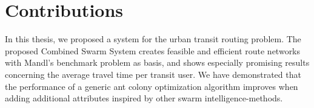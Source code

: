 \section{Contributions}


%

In this thesis, we proposed a system for the urban transit routing problem. The proposed Combined Swarm System creates feasible and efficient route networks with Mandl's benchmark problem\citep{mandl79} as basis, and shows especially promising results concerning the average travel time per transit user. We have demonstrated that the performance of a generic ant colony optimization algorithm improves when adding additional attributes inspired by other swarm intelligence-methods. %


